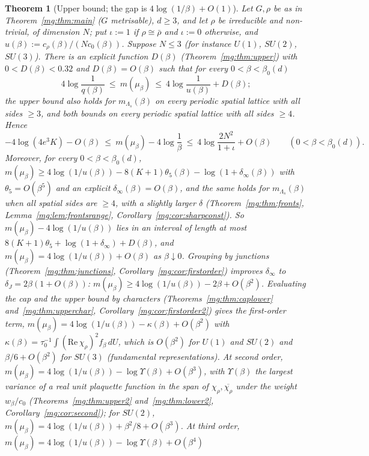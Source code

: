 \documentclass[11pt,a4paper]{article}
\newtheorem{theorem}{Theorem}[section]
\theoremstyle{definition}
\theoremstyle{remark}
\newcommand{\dU}{\,dU}
\begin{document}
\begin{theorem}[Upper bound; the gap is $4\log(1/\beta)+O(1)$]\label{mg:thm:upperintro}
Let $G,\rho$ be as in Theorem~\ref{mg:thm:main} ($G$ metrisable), $d\ge3$, and let $\rho$ be irreducible and non-trivial, of dimension
$N$; put $\iota:=1$ if $\rho\cong\bar\rho$ and $\iota:=0$ otherwise, and $u(\beta):=c_\rho(\beta)/(Nc_0(\beta))$. Suppose $N\le3$ (for instance
$U(1)$, $SU(2)$, $SU(3)$). There is an explicit function $D(\beta)$ (Theorem~\ref{mg:thm:upper}) with $0<D(\beta)<0.32$ and
$D(\beta)=O(\beta)$ such that for every $0<\beta<\beta_0(d)$
\[
4\log\frac1{q(\beta)}\ \le\ m(\mu_\beta)\ \le\ 4\log\frac1{u(\beta)}+D(\beta);
\]
the upper bound also holds for $m_{\Lambda_s}(\beta)$ on every periodic spatial lattice with all sides $\ge3$, and both bounds on every
periodic spatial lattice with all sides $\ge4$. Hence
\[
-4\log(4e^3K)-O(\beta)\ \le\ m(\mu_\beta)-4\log\frac1\beta\ \le\ 4\log\frac{2N^2}{1+\iota}+O(\beta)\qquad(0<\beta<\beta_0(d)).
\]
Moreover, for every $0<\beta<\beta_0(d)$, $m(\mu_\beta)\ge4\log(1/u(\beta))-8(K+1)\theta_5(\beta)-\log(1+\delta_\infty(\beta))$ with
$\theta_5=O(\beta^5)$ and an explicit $\delta_\infty(\beta)=O(\beta)$, and the same holds for $m_{\Lambda_s}(\beta)$ when all spatial sides are $\ge4$, with a
slightly larger $\delta$ (Theorem~\ref{mg:thm:fronts}, Lemma~\ref{mg:lem:frontsrange}, Corollary~\ref{mg:cor:sharpconst}). So
$m(\mu_\beta)-4\log(1/u(\beta))$ lies in an interval of length at most $8(K+1)\theta_5+\log(1+\delta_\infty)+D(\beta)$, and
$m(\mu_\beta)=4\log(1/u(\beta))+O(\beta)$ as $\beta\downarrow0$. Grouping by junctions (Theorem~\ref{mg:thm:junctions},
Corollary~\ref{mg:cor:firstorder}) improves $\delta_\infty$ to $\delta_J=2\beta(1+O(\beta))$: $m(\mu_\beta)\ge4\log(1/u(\beta))-2\beta+O(\beta^2)$. Evaluating
the cap and the upper bound by characters (Theorems~\ref{mg:thm:caplower} and~\ref{mg:thm:upperchar}, Corollary~\ref{mg:cor:firstorder2}) gives the
first-order term, $m(\mu_\beta)=4\log(1/u(\beta))-\kappa(\beta)+O(\beta^2)$ with $\kappa(\beta)=\tau_0^{-1}\int(\mathrm{Re}\,\chi_\rho)^2f_\beta\dU$, which is
$O(\beta^2)$ for $U(1)$ and $SU(2)$ and $\beta/6+O(\beta^2)$ for $SU(3)$ (fundamental representations). At second order,
$m(\mu_\beta)=4\log(1/u(\beta))-\log\Upsilon(\beta)+O(\beta^3)$, with $\Upsilon(\beta)$ the largest variance of a real unit plaquette function in the span of
$\chi_\rho,\overline{\chi_\rho}$ under the weight $w_\beta/c_0$ (Theorems~\ref{mg:thm:upper2} and~\ref{mg:thm:lower2}, Corollary~\ref{mg:cor:second}); for $SU(2)$,
$m(\mu_\beta)=4\log(1/u(\beta))+\beta^2/8+O(\beta^3)$. At third order, $m(\mu_\beta)=4\log(1/u(\beta))-\log\Upsilon(\beta)+O(\beta^4)$

\end{theorem}
\end{document}
